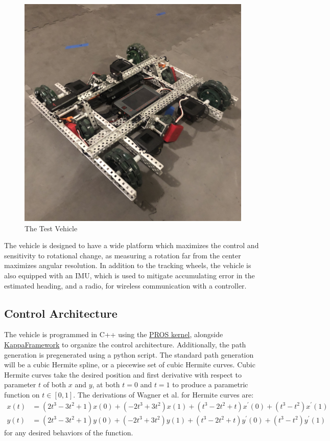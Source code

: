 \documentclass[mla7]{mla}
\begin{document}
\begin{paper}
\begin{figure}[H]
\includegraphics[width=0.6\linewidth]{TestVehicle}
\captionsetup{justification=centering}
\caption{The Test Vehicle}
\label{img:tv1}
\end{figure}

The vehicle is designed to have a wide platform which maximizes the control and sensitivity to rotational change, as measuring a rotation far from the center maximizes angular resolution. In addition to the tracking wheels, the vehicle is also equipped with an IMU, which is used to mitigate accumulating error in the estimated heading, and a radio, for wireless communication with a controller.

\subsection{Control Architecture}

The vehicle is programmed in C++ using the \href{https://github.com/purduesigbots/pros}{PROS kernel}, alongside \href{https://github.com/SpencerJ21/KappaFramework}{KappaFramework} to organize the control architecture. Additionally, the path generation is pregenerated using a python script. The standard path generation will be a cubic Hermite spline, or a piecewise set of cubic Hermite curves. Cubic Hermite curves take the desired position and first derivative with respect to parameter $t$ of both $x$ and $y$, at both $t=0$ and $t=1$ to produce a parametric function on $t\in[0,1]$. The derivations of Wagner et al. for Hermite curves are:
\begin{subequations}
\begin{align}
x(t)&=(2t^3-3t^2+1)x(0)+(-2t^3+3t^2)x(1)+(t^3-2t^2+t)x^\prime(0)+(t^3-t^2)x^\prime(1) \\
y(t)&=(2t^3-3t^2+1)y(0)+(-2t^3+3t^2)y(1)+(t^3-2t^2+t)y^\prime(0)+(t^3-t^2)y^\prime(1)
\end{align}
\end{subequations}
for any desired behaviors of the function.


\end{paper}
\end{document}
